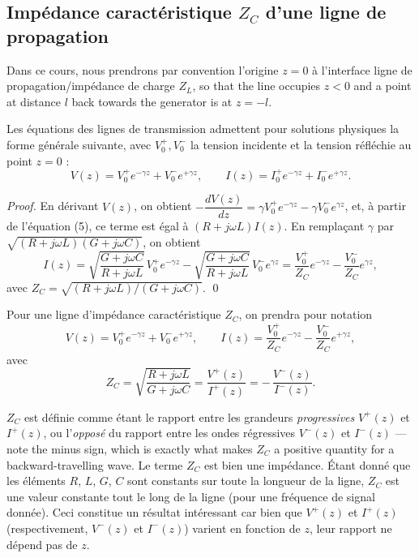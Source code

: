 \subsection{Impédance caractéristique $Z_C$ d'une ligne de propagation}
\begin{notation}
  Dans ce cours, nous prendrons par convention l'origine $z = 0$ à l'interface
  ligne de propagation/impédance de charge $Z_L$, so that the line occupies
  $z < 0$ and a point at distance $l$ back towards the generator is at
  $z = -l$.
\end{notation}

Les équations des lignes de transmission admettent pour solutions physiques la
forme générale suivante, avec $V_0^{+}, V_0^{-}$ la tension incidente et la
tension réfléchie au point $z = 0$ :
\[
  V(z) = V_0^{+}e^{-\gamma z} + V_0^{-}e^{+\gamma z},
  \qquad
  I(z) = I_0^{+}e^{-\gamma z} + I_0^{-}e^{+\gamma z}.
\]

\begin{proof}
  En dérivant $V(z)$, on obtient
  $-\dfrac{dV(z)}{dz} = \gamma V_0^{+}e^{-\gamma z} - \gamma V_0^{-}e^{\gamma z}$,
  et, à partir de l'équation (5), ce terme est égal à $(R+j\omega L)I(z)$. En
  remplaçant $\gamma$ par $\sqrt{(R+j\omega L)(G+j\omega C)}$, on obtient
  \[
    I(z) = \sqrt{\frac{G+j\omega C}{R+j\omega L}}\,V_0^{+}e^{-\gamma z}
         - \sqrt{\frac{G+j\omega C}{R+j\omega L}}\,V_0^{-}e^{\gamma z}
         = \frac{V_0^{+}}{Z_C}e^{-\gamma z} - \frac{V_0^{-}}{Z_C}e^{\gamma z},
  \]
  avec $Z_C = \sqrt{(R+j\omega L)/(G+j\omega C)}$. \qed
\end{proof}

\begin{definition}
  Pour une ligne d'impédance caractéristique $Z_C$, on prendra pour notation
  \[
    \boxed{\;
    V(z) = V_0^{+}e^{-\gamma z} + V_0^{-}e^{+\gamma z},
    \qquad
    I(z) = \frac{V_0^{+}}{Z_C}e^{-\gamma z} - \frac{V_0^{-}}{Z_C}e^{+\gamma z},
    \;}
  \]
  avec
  \[
    \boxed{\;
    Z_C = \sqrt{\frac{R+j\omega L}{G+j\omega C}}
        = \frac{V^{+}(z)}{I^{+}(z)} = -\,\frac{V^{-}(z)}{I^{-}(z)} .
    \;}
  \]
\end{definition}

$Z_C$ est définie comme étant le rapport entre les grandeurs
\emph{progressives} $V^{+}(z)$ et $I^{+}(z)$, ou l'\emph{opposé} du rapport
entre les ondes régressives $V^{-}(z)$ et $I^{-}(z)$ --- note the minus sign,
which is exactly what makes $Z_C$ a positive quantity for a backward-travelling
wave. Le terme $Z_C$ est bien une impédance. Étant donné que les éléments $R$,
$L$, $G$, $C$ sont constants sur toute la longueur de la ligne, $Z_C$ est une
valeur constante tout le long de la ligne (pour une fréquence de signal
donnée). Ceci constitue un résultat intéressant car bien que $V^{+}(z)$ et
$I^{+}(z)$ (respectivement, $V^{-}(z)$ et $I^{-}(z)$) varient en fonction de
$z$, leur rapport ne dépend pas de $z$.

